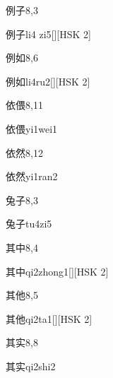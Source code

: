 \begin{entry}{例子}{8,3}
  \begin{phonetics}{例子}{li4 zi5}[][HSK 2]
  \end{phonetics}
\end{entry}

\begin{entry}{例如}{8,6}
  \begin{phonetics}{例如}{li4ru2}[][HSK 2]
  \end{phonetics}
\end{entry}

\begin{entry}{依偎}{8,11}
  \begin{phonetics}{依偎}{yi1wei1}
  \end{phonetics}
\end{entry}

\begin{entry}{依然}{8,12}
  \begin{phonetics}{依然}{yi1ran2}
  \end{phonetics}
\end{entry}

\begin{entry}{兔子}{8,3}
  \begin{phonetics}{兔子}{tu4zi5}
  \end{phonetics}
\end{entry}

\begin{entry}{其中}{8,4}
  \begin{phonetics}{其中}{qi2zhong1}[][HSK 2]
  \end{phonetics}
\end{entry}

\begin{entry}{其他}{8,5}
  \begin{phonetics}{其他}{qi2ta1}[][HSK 2]
  \end{phonetics}
\end{entry}

\begin{entry}{其实}{8,8}
  \begin{phonetics}{其实}{qi2shi2}
  \end{phonetics}
\end{entry}

